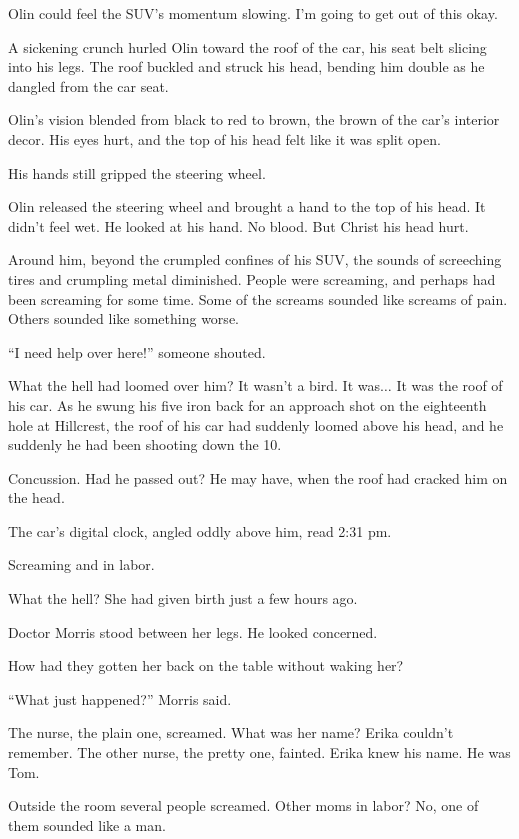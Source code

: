 Olin could feel the SUV's momentum slowing. I'm going to get out of this okay.

A sickening crunch hurled Olin toward the roof of the car, his seat belt slicing into his legs. The roof buckled and struck his head, bending him double as he dangled from the car seat.

Olin's vision blended from black to red to brown, the brown of the car's interior decor. His eyes hurt, and the top of his head felt like it was split open.

His hands still gripped the steering wheel.

Olin released the steering wheel and brought a hand to the top of his head. It didn't feel wet. He looked at his hand. No blood. But Christ his head hurt.

Around him, beyond the crumpled confines of his SUV, the sounds of screeching tires and crumpling metal diminished. People were screaming, and perhaps had been screaming for some time. Some of the screams sounded like screams of pain. Others sounded like something worse.

``I need help over here!'' someone shouted.

What the hell had loomed over him? It wasn't a bird. It was$\ldots$ It was the roof of his car. As he swung his five iron back for an approach shot on the eighteenth hole at Hillcrest, the roof of his car had suddenly loomed above his head, and he suddenly he had been shooting down the 10.

Concussion. Had he passed out? He may have, when the roof had cracked him on the head.

The car's digital clock, angled oddly above him, read 2:31 pm.




 Screaming and in labor.

What the hell? She had given birth just a few hours ago.

Doctor Morris stood between her legs. He looked concerned.

How had they gotten her back on the table without waking her?

``What just happened?'' Morris said.

The nurse, the plain one, screamed. What was her name? Erika couldn't remember. The other nurse, the pretty one, fainted. Erika knew his name. He was Tom.

Outside the room several people screamed. Other moms in labor? No, one of them sounded like a man.

